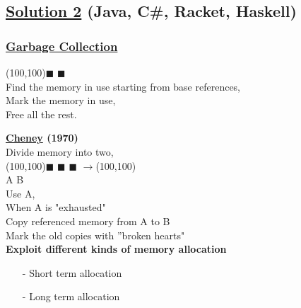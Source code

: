 \documentclass{article}
\begin{document}
\begin{flushleft}
\begin{flushleft}
\begin{flushleft}
\begin{flushleft}
\subsection*{\underline{Solution 2} (Java, C\#, Racket, Haskell)}
\subsubsection*{\underline{Garbage Collection}}
\begin{flushleft}
\vspace*{0.4cm}
\framebox(100,100){\huge $\blacksquare$ $\blacksquare$}\\
\vspace*{0.8cm}
Find the memory in use starting from base references,\\
\vspace*{0.1cm}
Mark the memory in use,\\
\vspace*{0.1cm}
Free all the rest.\\
\vspace*{1cm}

\textbf{\underline {Cheney} (1970)}\\
\vspace*{0.4cm}
Divide memory into two,\\
\vspace*{0.5cm}
\framebox(100,100){\huge $\blacksquare$ $\blacksquare$ $\blacksquare$  $\rightarrow$}\framebox(100,100){\huge \boxed{}\boxed{}\boxed{}}\\
\hspace*{1.5cm} A\hspace*{3cm} B\\
\vspace*{0.8cm}
Use A,\\
\vspace*{0.1cm}
When A is "exhausted"\\
\vspace*{0.1cm}
Copy referenced memory from A to B\\
\vspace*{0.1cm}
Mark the old copies with ''broken hearts"\\
\vspace*{0.8cm}
\textbf{Exploit different kinds of memory allocation}\\
\begin{itemize}
 \item[-] Short term allocation
 \item[-]Long term allocation
\end{itemize}


\end{flushleft}
\end{flushleft}
\end{flushleft}
\end{flushleft}
\end{flushleft}
\end{document}
